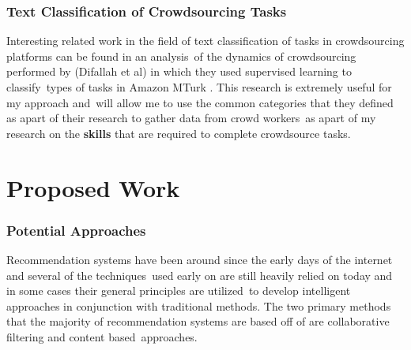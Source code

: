 \documentclass[letterpaper,12pt]{article}
\begin{document}
\subsection{Text Classification of Crowdsourcing Tasks}
Interesting related work in the field of text classification of tasks in crowdsourcing platforms can be found in an analysis\
of the dynamics of crowdsourcing performed by (Difallah et al) in which they used supervised learning to classify\
types of tasks in Amazon MTurk \cite{difallah2015dynamics}. This research is extremely useful for my approach and\
will allow me to use the common categories that they defined as apart of their research to gather data from crowd workers\
as apart of my research on the \textbf{skills} that are required to complete crowdsource tasks.

\chapter{Proposed Work}

\subsection{Potential Approaches}
Recommendation systems have been around since the early days of the internet and several of the techniques\
used early on are still heavily relied on today and in some cases their general principles are utilized\
to develop intelligent approaches in conjunction with traditional methods. The two primary methods that
the majority of recommendation systems are based off of are collaborative filtering and content based\
approaches. \cite{portugal2018use}
\end{document}
